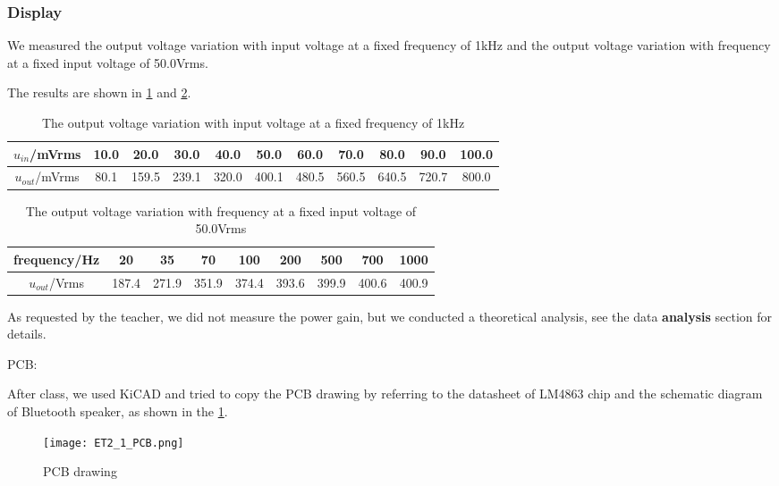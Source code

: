 \subsubsection{Display}

We measured the output voltage variation with input voltage at a fixed frequency of 1kHz and the output voltage variation with frequency at a fixed input voltage of 50.0Vrms.

The results are shown in \cref{tab:tab1} and \cref{tab:tab2}.

\begin{table}[htbp]
	\centering
	\begin{tabular}{|c|c|c|c|c|c|c|c|c|c|c|}
		\hline
		\( u_{in} \)/mVrms & 10.0 & 20.0 & 30.0 & 40.0 & 50.0 & 60.0 & 70.0 & 80.0 & 90.0 & 100.0 \\
		\hline
		\( u_{out} \)/mVrms & 80.1 & 159.5 & 239.1 & 320.0 & 400.1 & 480.5 & 560.5 & 640.5 & 720.7 & 800.0 \\
		\hline
	\end{tabular}
	\caption{The output voltage variation with input voltage at a fixed frequency of 1kHz}
	\label{tab:tab1}
\end{table}

\begin{table}[htbp]
	\centering
	\begin{tabular}{|c|c|c|c|c|c|c|c|c|}
		\hline
		frequency/Hz & 20 & 35 & 70 & 100 & 200 & 500 & 700 & 1000 \\
		\hline
		\( u_{out} \)/Vrms & 187.4 & 271.9 & 351.9 & 374.4 & 393.6 & 399.9 & 400.6 & 400.9 \\
		\hline
	\end{tabular}
	\caption{The output voltage variation with frequency at a fixed input voltage of 50.0Vrms}
	\label{tab:tab2}
\end{table}

As requested by the teacher, we did not measure the power gain, but we conducted a theoretical analysis, see the data \textbf{analysis} section for details.

PCB:

After class, we used KiCAD and tried to copy the PCB drawing by referring to the datasheet of LM4863 chip and the schematic diagram of Bluetooth speaker, as shown in the \cref{fig:fig-PCB}.

\begin{figure}[htbp]
	\centering
	\texttt{[image: ET2\_1\_PCB.png]}
	\caption{PCB drawing}
	\label{fig:fig-PCB}
\end{figure}


